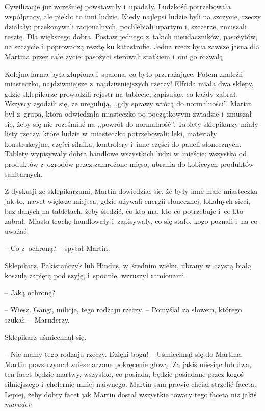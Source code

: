 \documentclass[oneside,polish,11pt,sfheadings]{mwbk}
\begin{document}
Cywilizacje już wcześniej powstawały i~upadały. Ludzkość potrzebowała
współpracy, ale piekło to inni ludzie. Kiedy najlepsi ludzie byli na
szczycie, rzeczy działały: przekonywali racjonalnych, pochlebiali
upartym i, szczerze, zmuszali resztę. Dla większego dobra. Postaw
jednego z~takich nieudaczników, pasożytów, na szczycie i~poprowadzą
resztę ku katastrofie. Jedna rzecz była zawsze jasna dla Martina przez
całe życie: pasożyci sterowali statkiem i~oni go rozwalą.

Kolejna farma była złupiona i~spalona, co było przerażające. Potem
znaleźli miasteczko, najdziwniejsze z~najdziwniejszych rzeczy! Elfrida
miała dwa sklepy, gdzie sklepikarze prowadzili rejestr na tablecie,
zapisując, co każdy zabrał. Wszyscy zgodzili się, że uregulują, ,,gdy
sprawy wrócą do normalności''. Martin był z~grupą, która odwiedzała
miasteczko po początkowym zwiadzie i~zmuszał się, żeby się nie roześmiać
na ,,powrót do normalność''. Tablety sklepikarzy miały listy rzeczy,
które ludzie w~miasteczku potrzebowali: leki, materiały konstrukcyjne,
części silnika, kontrolery i~inne części do paneli słonecznych. Tablety
wypisywały dobra handlowe wszystkich ludzi w~mieście: wszystko od
produktów z~ogrodów przez zamrożone mięso, ubrania do kobiecych
produktów sanitarnych.

Z dyskusji ze sklepikarzami, Martin dowiedział się, że były inne małe
miasteczka jak to, nawet większe miejsca, gdzie używali energii
słonecznej, lokalnych sieci, baz danych na tabletach, żeby śledzić, co
kto ma, kto co potrzebuje i~co kto zabrał. Miasta trochę handlowały i~zapisywały, co się stało, kogo poznali i~na co uważać.

-- Co z~ochroną? -- spytał Martin.

Sklepikarz, Pakistańczyk lub Hindus, w~średnim wieku, ubrany w~czystą
białą koszulę zapiętą pod szyję, i~spodnie, wzruszył ramionami. 

-- Jaką
ochronę?

-- Wiesz. Gangi, milicje, tego rodzaju rzeczy. -- Pomyślał za słowem,
którego szukał. -- Maruderzy.

Sklepikarz uśmiechnął się. 

-- Nie mamy tego rodzaju rzeczy. Dzięki bogu!
-- Uśmiechnął się do Martina. Martin powstrzymał zniesmaczone pokręcenie
głową. Za jakiś miesiąc lub dwa, ten facet będzie martwy, wszystko, co
posiada, będzie posiadane przez kogoś silniejszego i~cholernie mniej
naiwnego. Martin sam prawie chciał strzelić faceta. Lepiej, żeby dobry
facet jak Martin dostał wszystkie towary tego faceta niż jakiś
\textit{maruder}.
\end{document}
